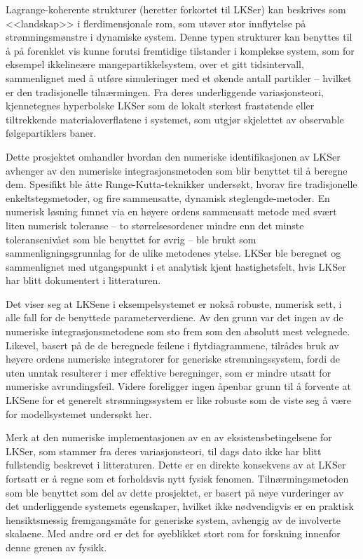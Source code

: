 Lagrange-koherente strukturer (heretter forkortet til LKSer) kan beskrives som
<<landskap>> i flerdimensjonale rom, som utøver stor innflytelse på
strømningsmønstre i dynamiske system. Denne typen strukturer kan benyttes til
å på forenklet vis kunne forutsi fremtidige tilstander i komplekse system, som
for eksempel ikkelineære mangepartikkelsystem, over et gitt tidsintervall,
sammenlignet med å utføre simuleringer med et økende antall partikler --
hvilket er den tradisjonelle tilnærmingen. Fra deres underliggende
variasjonsteori, kjennetegnes hyperbolske LKSer som de lokalt sterkest
frastøtende eller tiltrekkende materialoverflatene i systemet, som utgjør
skjelettet av observable følgepartiklers baner.

Dette prosjektet omhandler hvordan den numeriske identifikasjonen av LKSer
avhenger av den numeriske integrasjonsmetoden som blir benyttet til å beregne
dem. Spesifikt ble åtte Runge-Kutta-teknikker undersøkt, hvorav fire
tradisjonelle enkeltstegsmetoder, og fire sammensatte,
dynamisk steglengde-metoder. En numerisk løsning funnet via en høyere
ordens sammensatt metode med svært liten numerisk toleranse -- to
størrelsesordener mindre enn det minste toleransenivået som ble benyttet for
øvrig -- ble brukt som sammenligningsgrunnlag for de ulike metodenes ytelse.
LKSer ble beregnet og sammenlignet med utgangspunkt i et analytisk kjent
hastighetsfelt, hvis LKSer har blitt dokumentert i litteraturen.

Det viser seg at LKSene i eksempelsystemet er nokså robuste, numerisk sett,
i alle fall for de benyttede parameterverdiene. Av den grunn var det ingen
av de numeriske integrasjonsmetodene som sto frem som den absolutt mest
velegnede. Likevel, basert på de de beregnede feilene i flytdiagrammene,
tilrådes bruk av høyere ordens numeriske integratorer for generiske
strømningssystem, fordi de uten unntak resulterer i mer effektive beregninger,
som er mindre utsatt for numeriske avrundingsfeil. Videre foreligger ingen
åpenbar grunn til å forvente at LKSene for et generelt strømningssystem er like
robuste som de viste seg å være for modellsystemet undersøkt her.

Merk at den numeriske implementasjonen av en av eksistensbetingelsene for
LKSer, som stammer fra deres variasjonsteori, til dags dato ikke har blitt
fullstendig beskrevet i litteraturen. Dette er en direkte konsekvens
av at LKSer fortsatt er å regne som et forholdsvis nytt fysisk fenomen.
Tilnærmingsmetoden som ble benyttet som del av dette prosjektet, er basert
på nøye vurderinger av det underliggende systemets egenskaper, hvilket
ikke nødvendigvis er en praktisk hensiktsmessig fremgangsmåte for generiske
system, avhengig av de involverte skalaene. Med andre ord er det for øyeblikket
stort rom for forskning innenfor denne grenen av fysikk.

